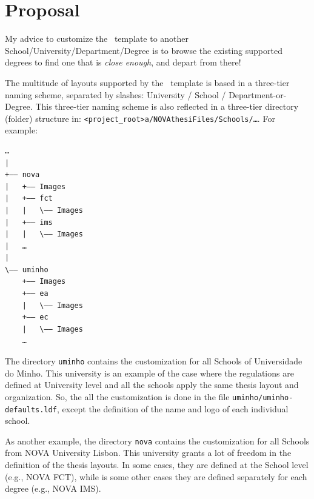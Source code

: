 
%

\chapter{Proposal}
\label{cha:proposal}

My advice to customize the \novathesis\ template to another School/University/Department/Degree is to browse the existing supported degrees to find one that is \emph{close enough}, and depart from there!

The multitude of layouts supported by the \novathesis\ template is based in a three-tier naming scheme, separated by slashes: University / School / Department-or-Degree.  This three-tier naming scheme is also reflected in a three-tier directory (folder) structure in: \verb!<project_root>a/NOVAthesiFiles/Schools/…!.  For example:

\begin{verbatim}
…
| 
+—— nova
|   +—— Images
|   +—— fct
|   |   \—— Images
|   +—— ims
|   |   \—— Images
|   …
|   
\—— uminho
    +—— Images
    +—— ea
    |   \—— Images
    +—— ec
    |   \—— Images
    …
\end{verbatim}

The directory \verb!uminho! contains the customization for all Schools of Universidade do Minho.  This university is an example of the case where the regulations are defined at University level and all the schools apply the same thesis layout and organization.  So, the all the customization is done in the file \verb!uminho/uminho-defaults.ldf!, except the definition of the name and logo of each individual school.

As another example, the directory \verb!nova! contains the customization for all Schools from NOVA University Lisbon. This university grants a lot of freedom in the definition of the thesis layouts.  In some cases, they are defined at the School level (e.g., NOVA FCT), while is some other cases they are defined separately for each degree (e.g., NOVA IMS).

